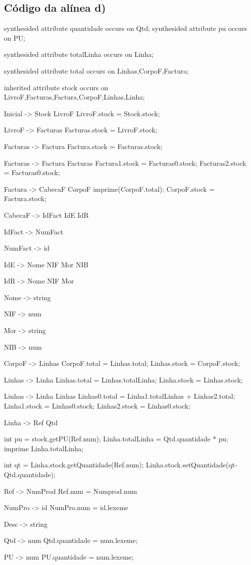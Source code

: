 \documentclass[11pt,a4paper]{article}
\begin{document}
\subsection{Código da alínea d)}
\begin{code_txt}
synthesided attribute quantidade occurs on Qtd;
synthesided attribute pu occurs on PU;

synthesided attribute totalLinha occurs on Linha;

synthesided attribute total occurs on Linhas,CorpoF,Factura;

inherited attribute stock occurs on LivroF,Facturas,Factura,CorpoF,Linhas,Linha;




Inicial -> Stock LivroF { LivroF.stock = Stock.stock; }

LivroF -> Facturas { Facturas.stock = LivroF.stock;}

Facturas -> Factura {Factura.stock = Facturas.stock;}

Facturas -> Factura Facturas {Factura1.stock = Facturas0.stock; Facturas2.stock = Facturas0.stock;}

Factura -> CabecaF CorpoF { imprime(CorpoF.total); CorpoF.stock = Factura.stock;}

CabecaF -> IdFact IdE IdR

IdFact -> NumFact

NumFact -> id

IdE -> Nome NIF Mor NIB

IdR -> Nome NIF Mor

Nome -> string

NIF -> num

Mor -> string

NIB -> num

CorpoF -> Linhas {CorpoF.total = Linhas.total; Linhas.stock = CorpoF.stock;}

Linhas -> Linha {Linhas.total = Linhas.totalLinha; Linha.stock = Linhas.stock;}

Linhas -> Linha Linhas {Linhas0.total = Linha1.totalLinhas + Linhas2.total; Linha1.stock = Linhas0.stock; Linhas2.stock = Linhas0.stock; }

Linha -> Ref Qtd { int pu = stock.getPU(Ref.num);
  Linha.totalLinha = Qtd.quantidade * pu;
imprime Linha.totalLinha;

int qt = Linha.stock.getQuantidade(Ref.num);
Linha.stock.setQuantidade(qt-Qtd.quantidade);
}

Ref -> NumProd { Ref.num = Numprod.num}

NumPro -> id {NumPro.num = id.lexeme}

Desc -> string

Qtd -> num { Qtd.quantidade = num.lexeme;}

PU -> num { PU.quantidade = num.lexeme;}



\end{code_txt}
\newpage
\end{document}
